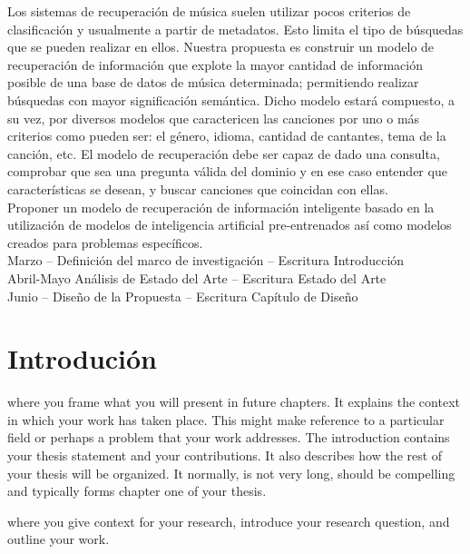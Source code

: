 \documentclass[11pt,a4paper,oldfontcommands]{memoir}
\begin{document}
\clearpage
\begin{multicols}{2}
Los sistemas de recuperación de música suelen utilizar pocos criterios de clasificación y usualmente a partir de metadatos. Esto limita el tipo de búsquedas que se pueden realizar en ellos. Nuestra propuesta es construir un modelo de recuperación de información que explote la mayor cantidad de información posible de una base de datos de música determinada; permitiendo realizar búsquedas con mayor significación semántica. Dicho modelo estará compuesto, a su vez, por diversos modelos que caractericen las canciones por uno o más criterios como pueden ser: el género, idioma, cantidad de cantantes, tema de la canción, etc. El modelo de recuperación debe ser capaz de dado una consulta, comprobar que sea una pregunta válida del dominio y en ese caso entender que características se desean, y buscar canciones que coincidan con ellas.
\\[1em]
Proponer un modelo de recuperación de información inteligente basado en la utilización de modelos de inteligencia artificial pre-entrenados así como modelos creados para problemas específicos. 
\\[1em]
Marzo –  Definición del marco de investigación – Escritura Introducción \\
Abril-Mayo  Análisis de Estado del Arte – Escritura Estado del Arte \\
Junio  –  Diseño de la Propuesta – Escritura Capítulo de Diseño \\


\section{Introdución}
where you frame what you will present in future chapters. It explains the context in which your work has taken
place. This might make reference to a particular field or perhaps a problem that your
work addresses. The introduction contains your thesis statement and your contributions.
It also describes how the rest of your thesis will be organized. It normally, is not very
long, should be compelling and typically forms chapter one of your thesis.
% 

where you give context for your research, introduce your research question, and outline your work.


\end{multicols}
\end{document}

